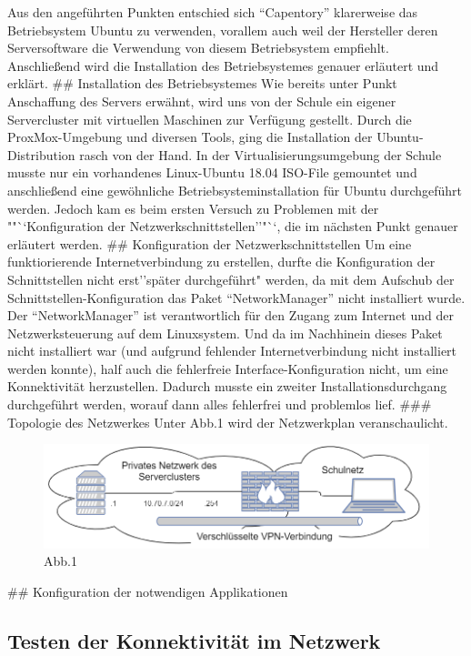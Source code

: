 \documentclass[
]{article}
\begin{document}
Aus den angeführten Punkten entschied sich ``Capentory'' klarerweise das
Betriebsystem Ubuntu zu verwenden, vorallem auch weil der Hersteller
deren Serversoftware die Verwendung von diesem Betriebsystem empfiehlt.
Anschließend wird die Installation des Betriebsystemes genauer erläutert
und erklärt. \#\# Installation des Betriebsystemes Wie bereits unter
Punkt Anschaffung des Servers erwähnt, wird uns von der Schule
ein eigener Servercluster mit virtuellen Maschinen zur Verfügung
gestellt. Durch die ProxMox-Umgebung und diversen Tools, ging die
Installation der Ubuntu-Distribution rasch von der Hand. In der
Virtualisierungsumgebung der Schule musste nur ein vorhandenes
Linux-Ubuntu 18.04 ISO-File gemountet und anschließend eine gewöhnliche
Betriebsysteminstallation für Ubuntu durchgeführt werden. Jedoch kam es
beim ersten Versuch zu Problemen mit der ""``Konfiguration der
Netzwerkschnittstellen''"``, die im nächsten Punkt genauer erläutert
werden. \#\# Konfiguration der Netzwerkschnittstellen Um eine
funktiorierende Internetverbindung zu erstellen, durfte die
Konfiguration der Schnittstellen nicht erst''später durchgeführt"
werden, da mit dem Aufschub der Schnittstellen-Konfiguration das Paket
``NetworkManager'' nicht installiert wurde. Der ``NetworkManager'' ist
verantwortlich für den Zugang zum Internet und der Netzwerksteuerung auf
dem Linuxsystem. Und da im Nachhinein dieses Paket nicht installiert war
(und aufgrund fehlender Internetverbindung nicht installiert werden
konnte), half auch die fehlerfreie Interface-Konfiguration nicht, um
eine Konnektivität herzustellen. Dadurch musste ein zweiter
Installationsdurchgang durchgeführt werden, worauf dann alles fehlerfrei
und problemlos lief. \#\#\# Topologie des Netzwerkes Unter Abb.1 wird
der Netzwerkplan veranschaulicht.
\begin{figure}
	\includegraphics{topo1.png}
	\caption{Abb.1}
\end{figure}
\#\# Konfiguration der notwendigen
Applikationen

\hypertarget{testen-der-konnektivituxe4t-im-netzwerk}{%
\subsection{Testen der Konnektivität im
Netzwerk}\label{testen-der-konnektivituxe4t-im-netzwerk}}
\end{document}
